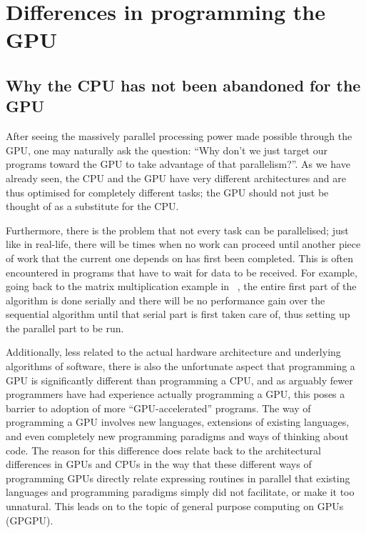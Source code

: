 \documentclass[a4paper,11pt]{article}
\begin{document}



\section{Differences in programming the GPU} %
\label{sec:differences_in_programming_the_gpu}

\subsection{Why the CPU has not been abandoned for the GPU} %
\label{sub:why_programs_aren_t_written_just_for_gpus_rather_than_cpus}
After seeing the massively parallel processing power made possible through the GPU, one may naturally ask the question:
``Why don't we just target our programs toward the GPU to take advantage of that parallelism?''. As we have already seen,
the CPU and the GPU have very different architectures and are thus optimised for completely different tasks; the GPU
should not just be thought of as a substitute for the CPU.

Furthermore, there is the problem that not every task can be parallelised; just like in real-life, there will be times when
no work can proceed until another piece of work that the current one depends on has first been completed. This is often encountered
in programs that have to wait for data to be received. For example, going back to the matrix multiplication example in
~, the entire first part of the algorithm is done serially and there will be no performance gain
over the sequential algorithm until that serial part is first taken care of, thus setting up the parallel part to be run.

Additionally, less related to the actual hardware architecture and underlying algorithms of software, there is also the
unfortunate aspect that programming a GPU is significantly different than programming a CPU, and as arguably fewer programmers
have had experience actually programming a GPU, this poses a barrier to adoption of more ``GPU-accelerated'' programs.
The way of programming a GPU involves new languages, extensions of existing languages, and even completely new programming
paradigms and ways of thinking about code. The reason for this difference does relate back to the architectural differences
in GPUs and CPUs in the way that these different ways of programming GPUs directly relate expressing routines in parallel
that existing languages and programming paradigms simply did not facilitate, or make it too unnatural. This leads on to
the topic of general purpose computing on GPUs (GPGPU).
\end{document}
